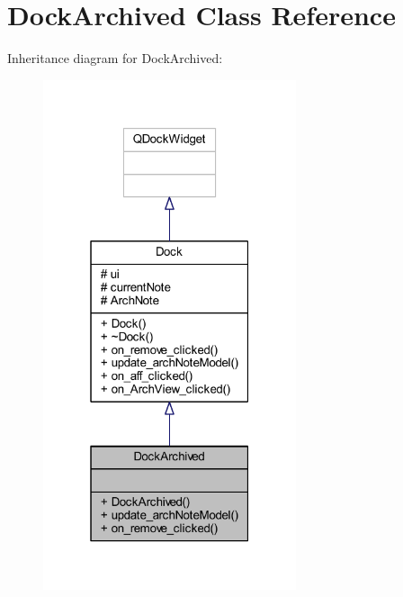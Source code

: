 \hypertarget{class_dock_archived}{}\section{Dock\+Archived Class Reference}
\label{class_dock_archived}


Inheritance diagram for Dock\+Archived\+:\nopagebreak
\begin{figure}[H]
\begin{center}
\leavevmode
\includegraphics[width=211pt]{class_dock_archived__inherit__graph}
\end{center}
\end{figure}


